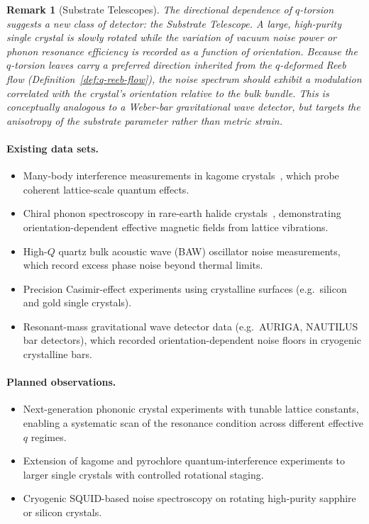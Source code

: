 \documentclass[12pt,a4paper]{report}
\newtheorem{remark}[theorem]{Remark}
\begin{document}
\begin{remark}[Substrate Telescopes]
\label{rem:substrate-telescope}
The directional dependence of $q$-torsion suggests a new class of detector:
the \emph{Substrate Telescope}.  A large, high-purity single crystal is
slowly rotated while the variation of vacuum noise power or phonon resonance
efficiency is recorded as a function of orientation.  Because the $q$-torsion
leaves carry a preferred direction inherited from the $q$-deformed Reeb flow
(Definition~\ref{def:q-reeb-flow}), the noise spectrum should exhibit a
modulation correlated with the crystal's orientation relative to the bulk
bundle.  This is conceptually analogous to a Weber-bar gravitational wave
detector, but targets the anisotropy of the substrate parameter rather than
metric strain.
\end{remark}

\paragraph{Existing data sets.}
\begin{itemize}
  \item Many-body interference measurements in kagome
        crystals~\cite{guo2025}, which probe coherent lattice-scale quantum
        effects.
  \item Chiral phonon spectroscopy in rare-earth halide
        crystals~\cite{luo2023}, demonstrating orientation-dependent
        effective magnetic fields from lattice vibrations.
  \item High-$Q$ quartz bulk acoustic wave (BAW) oscillator noise
        measurements, which record excess phase noise beyond thermal limits.
  \item Precision Casimir-effect experiments using crystalline surfaces
        (e.g.\ silicon and gold single crystals).
  \item Resonant-mass gravitational wave detector data (e.g.\ AURIGA,
        NAUTILUS bar detectors), which recorded orientation-dependent noise
        floors in cryogenic crystalline bars.
\end{itemize}

\paragraph{Planned observations.}
\begin{itemize}
  \item Next-generation phononic crystal experiments with tunable lattice
        constants, enabling a systematic scan of the resonance condition
        across different effective $q$ regimes.
  \item Extension of kagome and pyrochlore quantum-interference experiments
        to larger single crystals with controlled rotational staging.
  \item Cryogenic SQUID-based noise spectroscopy on rotating high-purity
        sapphire or silicon crystals.
\end{itemize}
\end{document}
